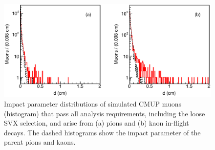 \documentclass[aps,prd,preprint,floatfix,nofootinbib,superscriptaddress,showpacs,amssymb]{revtex4}
\begin{document}
 \begin{figure}[]
 \begin{center}
 \vspace{-0.2in}
 \leavevmode
 \includegraphics*[width=\textwidth]{fake_2.eps}
 \caption[] {Impact parameter distributions of simulated CMUP muons
             (histogram) that pass all analysis requirements, including
             the loose SVX  selection, and arise from (a) pions and (b)
             kaon in-flight decays. The dashed histograms show the
             impact parameter of the parent pions and kaons.} 
 \label{fig:fake_2}
 \end{center}
 \end{figure}
\end{document}
